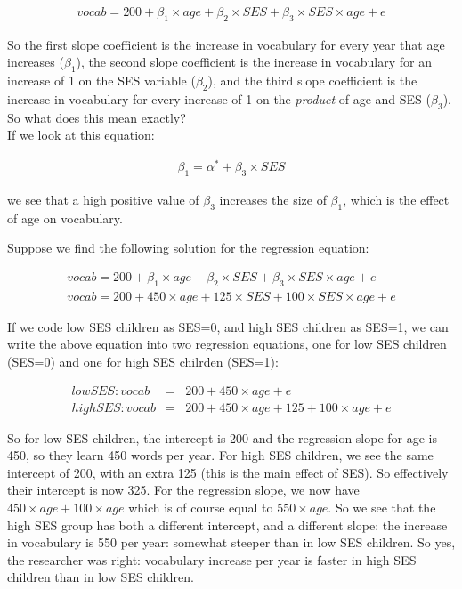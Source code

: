 \documentclass[]{report}\usepackage[]{graphicx}\usepackage[]{color}
\begin{document}
\begin{eqnarray} 
vocab = 200 + \beta_1\times age + \beta_2 \times SES + \beta_3 \times SES  \times age + e
\end{eqnarray}

So the first slope coefficient is the increase in vocabulary for every year that age increases ($\beta_1$), the second slope coefficient is the increase in vocabulary for an increase of 1 on the SES variable ($\beta_2$), and the third slope coefficient is the increase in vocabulary for every increase of 1 on the \textit{product} of age and SES ($\beta_3$).
\\
So what does this mean exactly?
\\


If we look at this equation:

\begin{eqnarray}
\beta_1 = \alpha^* + \beta_3 \times SES 
\end{eqnarray}

we see that a high positive value of $\beta_3$ increases the size of $\beta_1$, which is the effect of age on vocabulary.

Suppose we find the following solution for the regression equation:

\begin{eqnarray} 
vocab = 200 + \beta_1 \times age + \beta_2 \times SES + \beta_3 \times SES  \times age + e \\
vocab = 200 + 450 \times age + 125 \times SES + 100 \times SES  \times age + e
\end{eqnarray}

If we code low SES children as SES=0, and high SES children as SES=1, we can write the above equation into two regression equations, one for low SES children (SES=0) and one for high SES chilrden (SES=1):

\begin{eqnarray} 
low SES: vocab &=&  200 + 450 \times age  + e \\
high SES: vocab &=& 200 + 450 \times age + 125  + 100   \times age + e
\end{eqnarray}

So for low SES children, the intercept is 200 and the regression slope for age is 450, so they learn 450 words per year. For high SES children, we see the same intercept of 200, with an extra 125 (this is the main effect of SES). So effectively their intercept is now 325. For the regression slope, we now have $450 \times age+ 100   \times age$ which is of course equal to $550 \times age$. So we see that the high SES group has both a different intercept, and a different slope: the increase in vocabulary is 550 per year: somewhat steeper than in low SES children. So yes, the researcher was right: vocabulary increase per year is faster in high SES children than in low SES children. 
\end{document}
